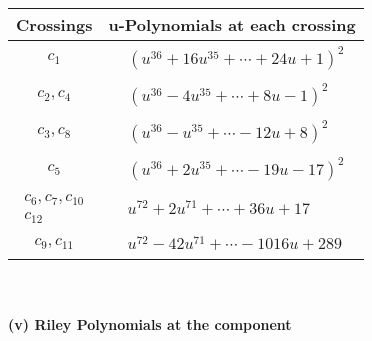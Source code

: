 \documentclass[1p]{elsarticle_modified}
\theoremstyle{definition}
\begin{document}
\begin{tabular}{m{50pt}|m{274pt}}
Crossings & \hspace{64pt}u-Polynomials at each crossing \\
\hline $$\begin{aligned}c_{1}\end{aligned}$$&$\begin{aligned}
&(u^{36}+16 u^{35}+\cdots+24 u+1)^{2}
\end{aligned}$\\
\hline $$\begin{aligned}c_{2},c_{4}\end{aligned}$$&$\begin{aligned}
&(u^{36}-4 u^{35}+\cdots+8 u-1)^{2}
\end{aligned}$\\
\hline $$\begin{aligned}c_{3},c_{8}\end{aligned}$$&$\begin{aligned}
&(u^{36}- u^{35}+\cdots-12 u+8)^{2}
\end{aligned}$\\
\hline $$\begin{aligned}c_{5}\end{aligned}$$&$\begin{aligned}
&(u^{36}+2 u^{35}+\cdots-19 u-17)^{2}
\end{aligned}$\\
\hline $$\begin{aligned}c_{6},c_{7},c_{10}\\c_{12}\end{aligned}$$&$\begin{aligned}
&u^{72}+2 u^{71}+\cdots+36 u+17
\end{aligned}$\\
\hline $$\begin{aligned}c_{9},c_{11}\end{aligned}$$&$\begin{aligned}
&u^{72}-42 u^{71}+\cdots-1016 u+289
\end{aligned}$\\
\hline
\end{tabular}\\~\\
\newpage\renewcommand{\arraystretch}{1}
\flushleft \textbf{(v) Riley Polynomials at the component}\newline \\
\end{document}
